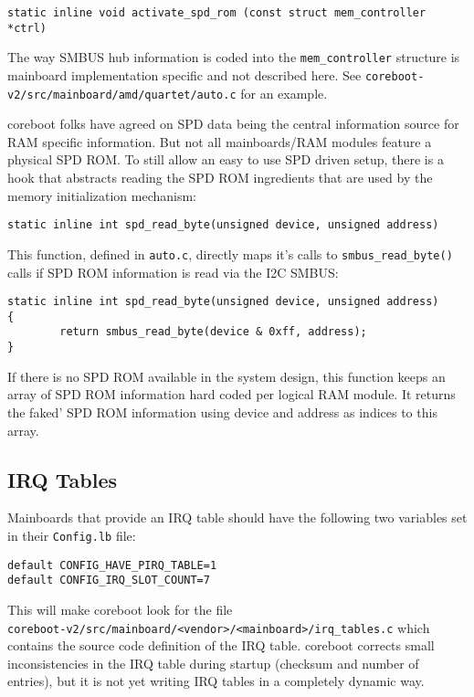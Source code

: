 \documentclass[titlepage,12pt]{article}
\begin{document}
\begin{verbatim}
static inline void activate_spd_rom (const struct mem_controller *ctrl)
\end{verbatim}

The way SMBUS hub information is coded into the \texttt{mem\_controller}
structure is mainboard implementation specific and not
described here.  See \texttt{coreboot-v2/src/mainboard/amd/quartet/auto.c}
for an example.

coreboot folks have agreed on SPD data being the central information
source for RAM specific information. But not all mainboards/RAM
modules feature a physical SPD ROM. To still allow an easy to use SPD
driven setup, there is a hook that abstracts reading the SPD ROM
ingredients that are used by the memory initialization mechanism:

\begin{verbatim}
static inline int spd_read_byte(unsigned device, unsigned address)
\end{verbatim}

This function, defined in \texttt{auto.c}, directly maps it's calls to
\texttt{smbus\_read\_byte()} calls if SPD ROM information is read via
the I2C SMBUS:

\begin{verbatim}
static inline int spd_read_byte(unsigned device, unsigned address)
{
        return smbus_read_byte(device & 0xff, address);
}
\end{verbatim}

If there is no SPD ROM available in the system design, this function
keeps an array of SPD ROM information hard coded per logical RAM module.
It returns the faked' SPD ROM information using device and address
as indices to this array.


\subsection {IRQ Tables}

Mainboards that provide an IRQ table should have the following two
variables set in their \texttt{Config.lb} file:

\begin{verbatim}
default CONFIG_HAVE_PIRQ_TABLE=1
default CONFIG_IRQ_SLOT_COUNT=7
\end{verbatim}

This will make coreboot look for the file \\
\texttt{coreboot-v2/src/mainboard/<vendor>/<mainboard>/irq\_tables.c} which
contains the source code definition of the IRQ table. coreboot corrects
small inconsistencies in the IRQ table during startup (checksum and
number of entries), but it is not yet writing IRQ tables in a completely
dynamic way.
\end{document}
